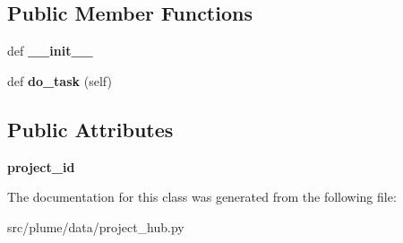 \subsection*{Public Member Functions}
\begin{DoxyCompactItemize}
\item 
def {\bfseries \+\_\+\+\_\+init\+\_\+\+\_\+}\hypertarget{classplume-creator_1_1src_1_1plume_1_1data_1_1project__hub_1_1_close_project_a23e0b4e0191d6c932d2a5062ddb19b3a}{}\label{classplume-creator_1_1src_1_1plume_1_1data_1_1project__hub_1_1_close_project_a23e0b4e0191d6c932d2a5062ddb19b3a}

\item 
def {\bfseries do\+\_\+task} (self)\hypertarget{classplume-creator_1_1src_1_1plume_1_1data_1_1project__hub_1_1_close_project_a5cb099174dc43440eaa7e8d9ecf0fd06}{}\label{classplume-creator_1_1src_1_1plume_1_1data_1_1project__hub_1_1_close_project_a5cb099174dc43440eaa7e8d9ecf0fd06}

\end{DoxyCompactItemize}
\subsection*{Public Attributes}
\begin{DoxyCompactItemize}
\item 
{\bfseries project\+\_\+id}\hypertarget{classplume-creator_1_1src_1_1plume_1_1data_1_1project__hub_1_1_close_project_a58a99604fc2ab0b414e5a27857a9a96d}{}\label{classplume-creator_1_1src_1_1plume_1_1data_1_1project__hub_1_1_close_project_a58a99604fc2ab0b414e5a27857a9a96d}

\end{DoxyCompactItemize}


The documentation for this class was generated from the following file\+:\begin{DoxyCompactItemize}
\item 
src/plume/data/project\+\_\+hub.\+py\end{DoxyCompactItemize}
